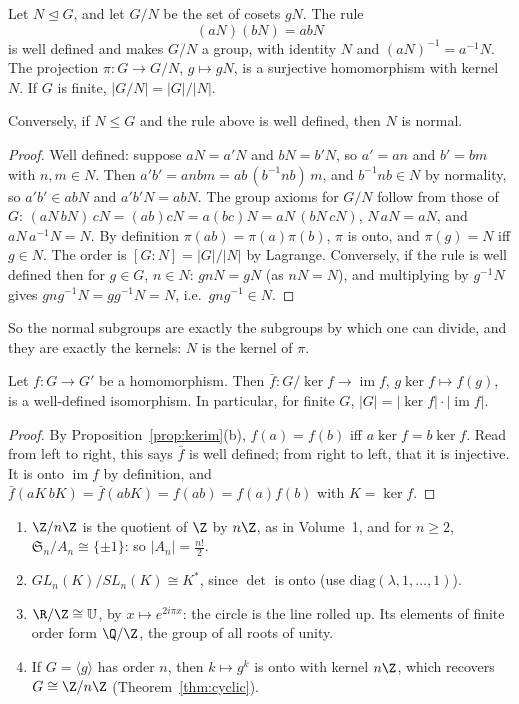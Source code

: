 \begin{theorem}\label{thm:quotient}
Let $N\trianglelefteq G$, and let $G/N$ be the set of cosets $gN$. The rule
\[
(aN)(bN)=abN
\]
is well defined and makes $G/N$ a group, with identity $N$ and $(aN)^{-1}=a^{-1}N$. The projection $\pi:G\to G/N$, $g\mapsto gN$, is a surjective homomorphism with kernel $N$. If $G$ is finite, $|G/N|=|G|/|N|$.

Conversely, if $N\le G$ and the rule above is well defined, then $N$ is normal.
\end{theorem}
\begin{proof}
Well defined: suppose $aN=a'N$ and $bN=b'N$, so $a'=an$ and $b'=bm$ with $n,m\in N$. Then $a'b'=anbm=ab\,(b^{-1}nb)\,m$, and $b^{-1}nb\in N$ by normality, so $a'b'\in abN$ and $a'b'N=abN$. The group axioms for $G/N$ follow from those of $G$: $(aN\,bN)\,cN=(ab)cN=a(bc)N=aN\,(bN\,cN)$, $N\,aN=aN$, and $aN\,a^{-1}N=N$. By definition $\pi(ab)=\pi(a)\pi(b)$, $\pi$ is onto, and $\pi(g)=N$ iff $g\in N$. The order is $[G:N]=|G|/|N|$ by Lagrange.
Conversely, if the rule is well defined then for $g\in G$, $n\in N$: $gnN=gN$ (as $nN=N$), and multiplying by $g^{-1}N$ gives $gng^{-1}N=gg^{-1}N=N$, i.e.\ $gng^{-1}\in N$.
\end{proof}

So the normal subgroups are exactly the subgroups by which one can divide, and they are exactly the kernels: $N$ is the kernel of $\pi$.

\begin{theorem}\label{thm:iso1}
Let $f:G\to G'$ be a homomorphism. Then $\bar f:G/\ker f\to\operatorname{im}f$, $g\ker f\mapsto f(g)$, is a well-defined isomorphism. In particular, for finite $G$, $|G|=|\ker f|\cdot|\operatorname{im}f|$.
\end{theorem}
\begin{proof}
By Proposition~\ref{prop:kerim}(b), $f(a)=f(b)$ iff $a\ker f=b\ker f$. Read from left to right, this says $\bar f$ is well defined; from right to left, that it is injective. It is onto $\operatorname{im}f$ by definition, and $\bar f(aK\,bK)=\bar f(abK)=f(ab)=f(a)f(b)$ with $K=\ker f$.
\end{proof}

\begin{example}\label{ex:iso1}
\begin{enumerate}[label=(\arabic*)]
\item $\Z/n\Z$ is the quotient of $\Z$ by $n\Z$, as in Volume~1, and for $n\ge2$, $\mathfrak S_n/A_n\cong\{\pm1\}$: so $|A_n|=\frac{n!}2$.
\item $GL_n(K)/SL_n(K)\cong K^*$, since $\det$ is onto (use $\mathrm{diag}(\lambda,1,\dots,1)$).
\item $\R/\Z\cong\mathbb U$, by $x\mapsto e^{2i\pi x}$: the circle is the line rolled up. Its elements of finite order form $\Q/\Z$, the group of all roots of unity.
\item If $G=\langle g\rangle$ has order $n$, then $k\mapsto g^k$ is onto with kernel $n\Z$, which recovers $G\cong\Z/n\Z$ (Theorem~\ref{thm:cyclic}).
\end{enumerate}
\end{example}

